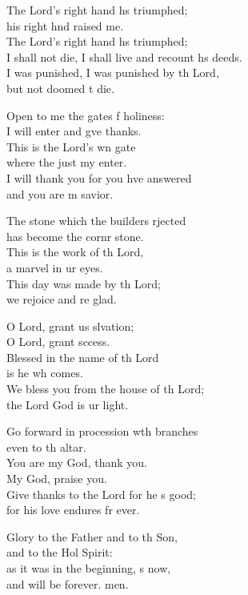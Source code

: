 \begin{psalmverse}
\begin{patverse}
    The Lord’s right hand hs triumphed;\Med\\
    his right hnd raised me.\\
    The Lord’s right hand hs triumphed;\Med\\
    I shall not die, I shall live and recount h\pointup{\i}s deeds.\\
    I was punished, I was punished by th Lord,\Med\\
    but not doomed t die.

    Open to me the gates f holiness:\Med\\
    I will enter and g\pointup{\i}ve thanks.\\
    This is the Lord’s wn gate\Med\\
    where the just my enter.\\
    I will thank you for you hve answered\Med\\
    and you are m savior.

    The stone which the builders rjected\Med\\
    has become the cornr stone.\\
    This is the work of th Lord,\Med\\
    a marvel in ur eyes.\\
    This day was made by th Lord;\Med\\
    we rejoice and re glad.

    O Lord, grant us slvation;\Med\\
    O Lord, grant sccess.\\
    Blessed in the name of th Lord\Med\\
    is he wh comes.\\
    We bless you from the house of th Lord;\Med\\
    the Lord God is ur light.

    Go forward in procession w\pointup{\i}th branches\Med\\
    even to th altar.\\
    You are my God,  thank you.\Med\\
    My God,  praise you.\\
    Give thanks to the Lord for he \pointup{\i}s good;\Med\\
    for his love endures fr ever.

    Glory to the Father and to th Son,\Med\\
    and to the Hol Spirit:\\
    as it was in the beginning, \pointup{\i}s now,\Med\\
    and will be forever. men.
  \end{patverse}
\end{psalmverse}
